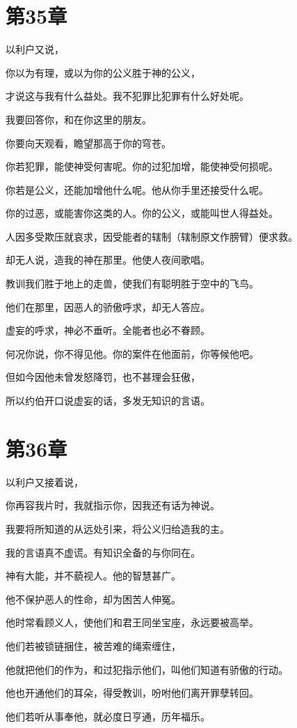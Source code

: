 \documentclass[12pt,oneside]{book}
\begin{document}
\chapter{第35章}
以利户又说，

你以为有理，或以为你的公义胜于神的公义，

才说这与我有什么益处。我不犯罪比犯罪有什么好处呢。

我要回答你，和在你这里的朋友。

你要向天观看，瞻望那高于你的穹苍。

你若犯罪，能使神受何害呢。你的过犯加增，能使神受何损呢。

你若是公义，还能加增他什么呢。他从你手里还接受什么呢。

你的过恶，或能害你这类的人。你的公义，或能叫世人得益处。

人因多受欺压就哀求，因受能者的辖制（辖制原文作膀臂）便求救。

却无人说，造我的神在那里。他使人夜间歌唱。

教训我们胜于地上的走兽，使我们有聪明胜于空中的飞鸟。

他们在那里，因恶人的骄傲呼求，却无人答应。

虚妄的呼求，神必不垂听。全能者也必不眷顾。

何况你说，你不得见他。你的案件在他面前，你等候他吧。

但如今因他未曾发怒降罚，也不甚理会狂傲，

所以约伯开口说虚妄的话，多发无知识的言语。


\chapter{第36章}
以利户又接着说，

你再容我片时，我就指示你，因我还有话为神说。

我要将所知道的从远处引来，将公义归给造我的主。

我的言语真不虚谎。有知识全备的与你同在。

神有大能，并不藐视人。他的智慧甚广。

他不保护恶人的性命，却为困苦人伸冤。

他时常看顾义人，使他们和君王同坐宝座，永远要被高举。

他们若被锁链捆住，被苦难的绳索缠住，

他就把他们的作为，和过犯指示他们，叫他们知道有骄傲的行动。

他也开通他们的耳朵，得受教训，吩咐他们离开罪孽转回。

他们若听从事奉他，就必度日亨通，历年福乐。
\end{document}
